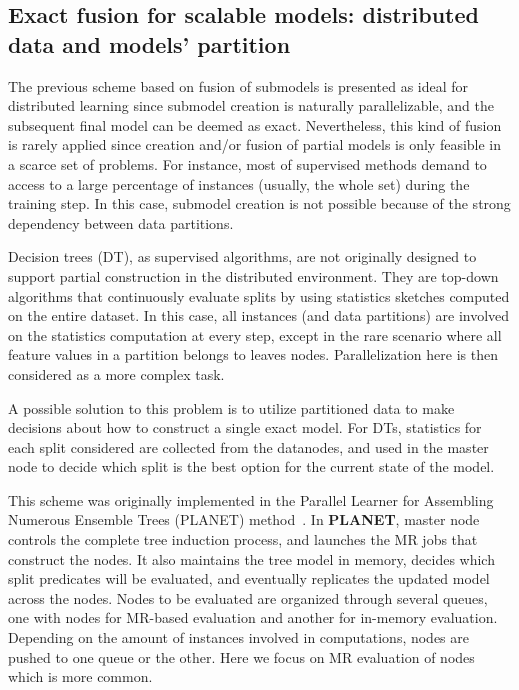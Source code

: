 \documentclass[3p,review]{elsarticle}
\begin{document}
\subsection{Exact fusion for scalable models: distributed data and models' partition}\label{subsec:exact}

The previous scheme based on fusion of submodels is presented as ideal for distributed learning since submodel creation is naturally parallelizable, and the subsequent final model can be deemed as exact. Nevertheless, this kind of fusion is rarely applied since creation and/or fusion of partial models is only feasible in a scarce set of problems. For instance, most of supervised methods demand to access to a large percentage of instances (usually, the whole set) during the training step. In this case, submodel creation is not possible because of the strong dependency between data partitions. 

Decision trees (DT), as supervised algorithms, are not originally designed to support partial construction in the distributed environment. They are top-down algorithms that continuously evaluate splits by using statistics sketches computed on the entire dataset. In this case, all instances (and data partitions) are involved on the statistics computation at every step, except in the rare scenario where all feature values in a partition belongs to leaves nodes. Parallelization here is then considered as a more complex task.

A possible solution to this problem is to utilize partitioned data to make decisions about how to construct a single exact model. For DTs, statistics for each split considered are collected from the datanodes, and used in the master node to decide which split is the best option for the current state of the model.

This scheme was originally implemented in the Parallel Learner for Assembling Numerous
Ensemble Trees (PLANET) method~\cite{Panda09-DT-RF}. In \textbf{PLANET}, master node controls the complete tree induction process, and launches the MR jobs that construct the nodes. It also maintains the tree model in memory, decides which split predicates will be evaluated, and eventually replicates the updated model across the nodes. Nodes to be evaluated are organized through several queues, one with nodes for MR-based evaluation and another for in-memory evaluation. Depending on the amount of instances involved in computations, nodes are pushed to one queue or the other. Here we focus on MR evaluation of nodes which is more common.
\end{document}
